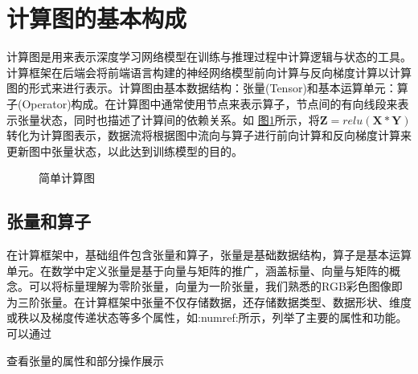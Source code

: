 \documentclass[letterpaper,10pt,english]{sphinxmanual}
\let\sphinxpxdimen\pdfpxdimen\else\newdimen\sphinxpxdimen
\begin{document}
\section{计算图的基本构成}
\label{\detokenize{chapter_computational_graph/components_of_computational_graph:id1}}\label{\detokenize{chapter_computational_graph/components_of_computational_graph::doc}}
\sphinxAtStartPar
计算图是用来表示深度学习网络模型在训练与推理过程中计算逻辑与状态的工具。计算框架在后端会将前端语言构建的神经网络模型前向计算与反向梯度计算以计算图的形式来进行表示。计算图由基本数据结构：张量(Tensor)和基本运算单元：算子(Operator)构成。在计算图中通常使用节点来表示算子，节点间的有向线段来表示张量状态，同时也描述了计算间的依赖关系。如
\hyperref[\detokenize{chapter_computational_graph/components_of_computational_graph:simpledag}]{图\ref{\detokenize{chapter_computational_graph/components_of_computational_graph:simpledag}}}所示，将\(\boldsymbol{Z}=relu(\boldsymbol{X}*\boldsymbol{Y})\)转化为计算图表示，数据流将根据图中流向与算子进行前向计算和反向梯度计算来更新图中张量状态，以此达到训练模型的目的。

\begin{figure}[H]
\centering
\capstart

\noindent\sphinxincludegraphics[width=300\sphinxpxdimen]{{simpledag}.svg}
\caption{简单计算图}\label{\detokenize{chapter_computational_graph/components_of_computational_graph:id6}}\label{\detokenize{chapter_computational_graph/components_of_computational_graph:simpledag}}\end{figure}


\subsection{张量和算子}
\label{\detokenize{chapter_computational_graph/components_of_computational_graph:id2}}
\sphinxAtStartPar
在计算框架中，基础组件包含张量和算子，张量是基础数据结构，算子是基本运算单元。在数学中定义张量是基于向量与矩阵的推广，涵盖标量、向量与矩阵的概念。可以将标量理解为零阶张量，向量为一阶张量，我们熟悉的RGB彩色图像即为三阶张量。在计算框架中张量不仅存储数据，还存储数据类型、数据形状、维度或秩以及梯度传递状态等多个属性，如:numref:所示，列举了主要的属性和功能。可以通过%
\begin{footnote}[4]\sphinxAtStartFootnote
{}
%
\end{footnote}查看张量的属性和部分操作展示
\end{document}

